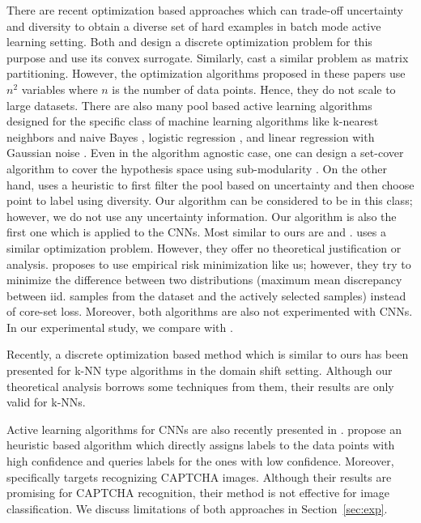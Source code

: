 \documentclass{article} %
\begin{document}
There are recent optimization based approaches which can trade-off uncertainty
and diversity to obtain a diverse set of hard examples in batch mode active learning setting. Both
\citet{elhamifar2013convex} and \citet{yang2015multi} design a discrete optimization problem for this
purpose and use its convex surrogate. Similarly, \citet{guo2010} cast a similar problem as matrix partitioning. However, the optimization algorithms proposed in these papers use $n^2$
variables where $n$ is the number of data points. Hence, they do not scale to
large datasets. There are also many pool based active
learning algorithms designed for the specific class of machine learning
algorithms like k-nearest neighbors and naive Bayes \citep{wei2015submodularity}, logistic regression \cite{hoi_et_al, guo_et_al}, and linear regression with Gaussian noise \citep{yu2006active}.
Even in the algorithm agnostic case, one can design a set-cover algorithm to
cover the hypothesis space using sub-modularity \citep{guillory2010interactive,
golovin2011adaptive}. On the other hand, \citet{demir2011batch} uses a heuristic to first filter the pool based on uncertainty and then choose point to label using diversity. Our algorithm can be considered to be in this class;
however, we do not use any uncertainty information. Our algorithm is also the
first one which is applied to the CNNs. Most similar to ours are \citep{porikli} and \citep{kdd13}. \citet{porikli}
uses a similar optimization problem. However, they offer no theoretical
justification or analysis. \citet{kdd13} proposes to use empirical risk minimization like us; however, they try to minimize the difference between two distributions (maximum mean discrepancy between iid. samples from the dataset and the actively selected samples) instead of core-set loss. Moreover, both algorithms are also not experimented with CNNs. In our experimental study, we compare with \citep{kdd13}.

Recently, a discrete optimization based method \citep{BerlindU15} which is
similar to ours has been presented for k-NN type algorithms in the domain shift
setting. Although our theoretical analysis borrows some techniques from them, their results are only valid for k-NNs.

Active learning algorithms for CNNs are also recently presented in
\citep{wang2016cost, captcha}. \citet{wang2016cost} propose an heuristic based algorithm which directly assigns
labels to the data points with high confidence and queries labels for the ones
with low confidence. Moreover, \citet{captcha} specifically targets recognizing CAPTCHA images. Although their results are promising for CAPTCHA recognition, their method is not effective for image classification. We discuss limitations of both approaches in Section~\ref{sec:exp}.
\end{document}
